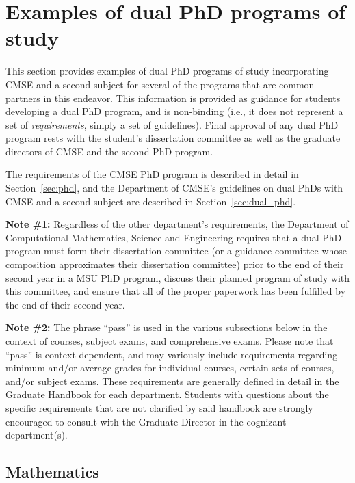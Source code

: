 \section{Examples of dual PhD programs of study}
\label{sec:dual_phd_examples}

This section provides examples of dual PhD programs of study
incorporating CMSE and a second subject for several of the programs
that are common partners in this endeavor.  This information is
provided as guidance for students developing a dual PhD program, and
is non-binding (i.e., it does not represent a set of
\textit{requirements}, simply a set of guidelines).  Final approval of
any dual PhD program rests with the student's dissertation committee
as well as the graduate directors of CMSE and the second PhD program.

The requirements of the CMSE PhD program is described in detail in
Section~\ref{sec:phd}, and the Department of CMSE's guidelines on dual
PhDs with CMSE and a second subject are described in
Section~\ref{sec:dual_phd}.

\textbf{Note \#1:}  Regardless of the other department's requirements, the
Department of Computational Mathematics, Science and Engineering
requires that a dual PhD program must form their dissertation
committee (or a guidance committee whose composition approximates
their dissertation committee) prior to the end of their second year in
a MSU PhD program, discuss their planned program of study with this
committee, and ensure that all of the proper paperwork has been
fulfilled by the end of their second year.

\textbf{Note \#2:}  The phrase ``pass'' is used in the various
subsections below in the context of courses, subject exams, and
comprehensive exams.  Please note that ``pass'' is context-dependent,
and may variously include requirements regarding minimum and/or
average grades for individual courses, certain sets of courses, and/or
subject exams.  These requirements are generally defined in detail in
the Graduate Handbook for each department.  Students with questions
about the specific requirements that are not clarified by said handbook are strongly encouraged to consult
with the Graduate Director in the cognizant department(s).

\subsection{Mathematics}

